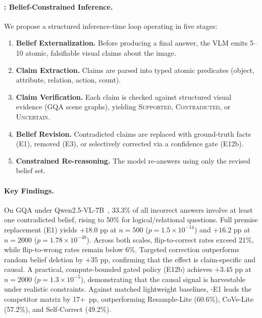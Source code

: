\paragraph{\bci{}: Belief-Constrained Inference.}
We propose a structured inference-time loop operating in five stages:
\begin{enumerate}[leftmargin=1.5em,itemsep=1pt,topsep=2pt]
  \item \textbf{Belief Externalization.} Before producing a final answer, the VLM
    emits 5--10 atomic, falsifiable visual claims about the image.
  \item \textbf{Claim Extraction.} Claims are parsed into typed atomic predicates
    (object, attribute, relation, action, count).
  \item \textbf{Claim Verification.} Each claim is checked against structured visual
    evidence (GQA scene graphs), yielding
    \textsc{Supported}, \textsc{Contradicted}, or \textsc{Uncertain}.
  \item \textbf{Belief Revision.} Contradicted claims are replaced with
    ground-truth facts (E1), removed (E3), or selectively corrected via a
    confidence gate (E12b).
  \item \textbf{Constrained Re-reasoning.} The model re-answers using only the
    revised belief set.
\end{enumerate}

\paragraph{Key Findings.}
On GQA under Qwen2.5-VL-7B~\cite{bai2025qwen}, 33.3\% of all incorrect answers
involve at least one contradicted belief, rising to 50\% for logical/relational
questions. Full premise replacement (E1) yields $+18.0$ pp at $n{=}500$
($p{=}1.5{\times}10^{-14}$) and $+16.2$ pp at $n{=}2000$
($p{=}1.78{\times}10^{-48}$). Across both scales, flip-to-correct rates exceed
21\%, while flip-to-wrong rates remain below 6\%.
Targeted correction outperforms random belief deletion by $+35$ pp, confirming
that the effect is claim-specific and causal.
A practical, compute-bounded gated policy (E12b) achieves $+3.45$ pp at $n{=}2000$
($p{=}1.3{\times}10^{-5}$), demonstrating that the causal signal is harvestable
under realistic constraints.
Against matched lightweight baselines, \bci-E1 leads the competitor matrix by 17+~pp,
outperforming Resample-Lite (60.6\%), CoVe-Lite (57.2\%), and Self-Correct (49.2\%).

